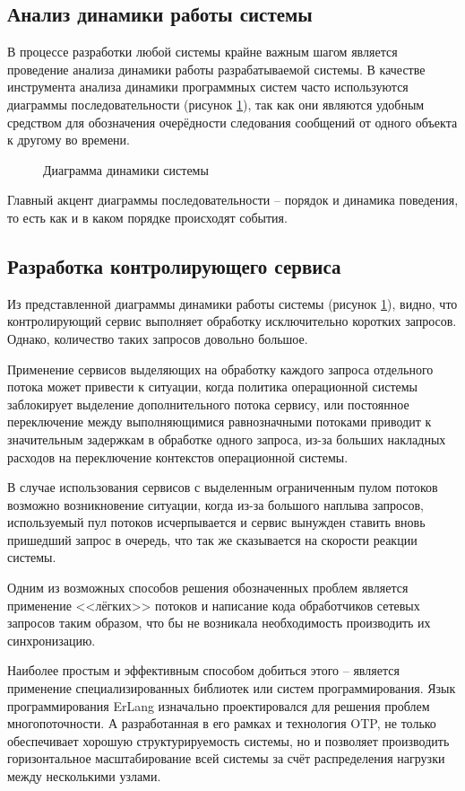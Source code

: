 \subsection{Анализ динамики работы системы}
В процессе разработки любой системы крайне важным шагом является проведение анализа динамики
работы разрабатываемой системы.
В качестве инструмента анализа динамики программных систем часто используются диаграммы последовательности (рисунок \ref{img:dynamic}),
так как они являются удобным средством для обозначения очерёдности следования сообщений от одного объекта к другому во времени.
\begin{figure}[ht]
	\caption{Диаграмма динамики системы}
	\label{img:dynamic}
\end{figure}
Главный акцент диаграммы последовательности -- порядок и динамика поведения, то есть как и в каком порядке происходят события.

\subsection{Разработка контролирующего сервиса}
Из представленной диаграммы динамики работы системы (рисунок \ref{img:dynamic}), видно,
что контролирующий сервис выполняет обработку исключительно коротких запросов. Однако, количество таких
запросов довольно большое.

Применение сервисов выделяющих на обработку каждого запроса отдельного потока может привести к
ситуации, когда политика операционной системы заблокирует выделение дополнительного потока сервису,
или постоянное переключение между выполняющимися равнозначными потоками приводит к значительным задержкам
в обработке одного запроса, из-за больших накладных расходов на переключение контекстов операционной системы.

В случае использования сервисов с выделенным ограниченным пулом потоков возможно возникновение ситуации, когда
из-за большого наплыва запросов, используемый пул потоков исчерпывается и сервис вынужден ставить вновь
пришедший запрос в очередь, что так же сказывается на скорости реакции системы.

Одним из возможных способов решения обозначенных проблем является применение <<лёгких>> потоков и написание кода
обработчиков сетевых запросов таким образом, что бы не возникала необходимость производить их синхронизацию.


Наиболее простым и эффективным способом добиться этого -- является применение специализированных библиотек или
систем программирования. Язык программирования ErLang изначально проектировался для решения проблем
многопоточности. А разработанная в его рамках и технология OTP, не только обеспечивает хорошую структурируемость
системы, но и позволяет производить горизонтальное масштабирование всей системы за счёт распределения нагрузки
между несколькими узлами.

